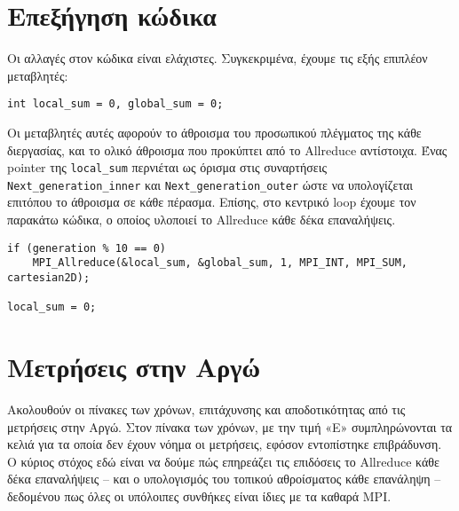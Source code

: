 \section{Επεξήγηση κώδικα}
Οι αλλαγές στον κώδικα είναι ελάχιστες. Συγκεκριμένα, έχουμε τις εξής επιπλέον μεταβλητές:

\begin{tcolorbox}
\begin{verbatim}
int local_sum = 0, global_sum = 0;
\end{verbatim}
\end{tcolorbox}

\begin{multicols}{2}
Οι μεταβλητές αυτές αφορούν το άθροισμα του προσωπικού πλέγματος της κάθε διεργασίας, και το ολικό άθροισμα που προκύπτει από το Allreduce αντίστοιχα. Ένας pointer της \texttt{local_sum} περνιέται ως όρισμα στις συναρτήσεις \texttt{Next_generation_inner} και \texttt{Next_generation_outer} ώστε να υπολογίζεται επιτόπου το άθροισμα σε κάθε πέρασμα. Επίσης, στο κεντρικό loop έχουμε τον παρακάτω κώδικα, ο οποίος υλοποιεί το Allreduce κάθε δέκα επαναλήψεις.
\end{multicols}

\begin{tcolorbox}
\begin{verbatim}
if (generation % 10 == 0)
    MPI_Allreduce(&local_sum, &global_sum, 1, MPI_INT, MPI_SUM, cartesian2D);
    
local_sum = 0;
\end{verbatim}
\end{tcolorbox}

\section{Μετρήσεις στην Αργώ}
\begin{multicols}{2}
Ακολουθούν οι πίνακες των χρόνων, επιτάχυνσης και αποδοτικότητας από τις μετρήσεις στην Αργώ. Στον πίνακα των χρόνων, με την τιμή «Ε» συμπληρώνονται τα κελιά για τα οποία δεν έχουν νόημα οι μετρήσεις, εφόσον εντοπίστηκε επιβράδυνση. Ο κύριος στόχος εδώ είναι να δούμε πώς επηρεάζει τις επιδόσεις το Allreduce κάθε δέκα επαναλήψεις -- και ο υπολογισμός του τοπικού αθροίσματος κάθε επανάληψη -- δεδομένου πως όλες οι υπόλοιπες συνθήκες είναι ίδιες με τα καθαρά MPI.
\end{multicols}

